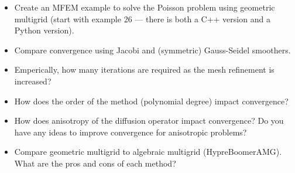 \documentclass{article}
\begin{document}
\begin{itemize}
   \item Create an MFEM example to solve the Poisson problem using geometric multigrid (start with example 26 --- there is both a C++ version and a Python version).
   \item Compare convergence using Jacobi and (symmetric) Gauss-Seidel smoothers.
   \item Emperically, how many iterations are required as the mesh refinement is increased?
   \item How does the order of the method (polynomial degree) impact convergence?
   \item How does anisotropy of the diffusion operator impact convergence? Do you have any ideas to improve convergence for anisotropic problems?
   \item Compare geometric multigrid to algebraic multigrid (HypreBoomerAMG). What are the pros and cons of each method?
\end{itemize}
\end{document}
